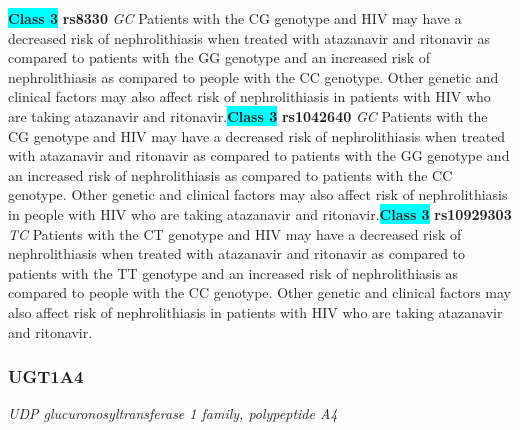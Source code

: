 \documentclass{report}
\begin{document}
\textbf{\colorbox{cyan} {Class 3}} \textbf{ rs8330 } \textit{ GC }
Patients with the CG genotype and HIV may have a decreased risk of nephrolithiasis when treated with atazanavir and ritonavir as compared to patients with the GG genotype and an increased risk of nephrolithiasis as compared to people with the CC genotype. Other genetic and clinical factors may also affect risk of nephrolithiasis in patients with HIV who are taking atazanavir and ritonavir.\newline\textbf{\colorbox{cyan} {Class 3}} \textbf{ rs1042640 } \textit{ GC }
Patients with the CG genotype and HIV may have a decreased risk of nephrolithiasis when treated with atazanavir and ritonavir as compared to patients with the GG genotype and an increased risk of nephrolithiasis as compared to patients with the CC genotype. Other genetic and clinical factors may also affect risk of nephrolithiasis in people with HIV who are taking atazanavir and ritonavir.\newline\textbf{\colorbox{cyan} {Class 3}} \textbf{ rs10929303 } \textit{ TC }
Patients with the CT genotype and HIV may have a decreased risk of nephrolithiasis when treated with atazanavir and ritonavir as compared to patients with the TT genotype and an increased risk of nephrolithiasis as compared to people with the CC genotype. Other genetic and clinical factors may also affect risk of nephrolithiasis in patients with HIV who are taking atazanavir and ritonavir. \newline\subsubsection{ UGT1A4 }
\textit{ UDP glucuronosyltransferase 1 family, polypeptide A4 }
\end{document}
